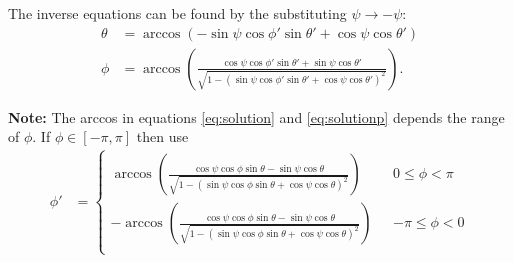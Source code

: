 \documentclass[11pt]{article}
\begin{document}
The inverse equations can be found by the substituting $\psi \rightarrow -\psi$:
\begin{subequations}
\begin{align}
  \theta &= \arccos\left(-\sin\psi\cos\phi'\sin\theta' + \cos\psi\cos\theta'\right)\\
  \phi &= \arccos\left(\frac{\cos\psi\cos\phi'\sin\theta' + \sin\psi\cos\theta'}{\sqrt{1 - (\sin\psi\cos\phi'\sin\theta' + \cos\psi\cos\theta')^2}}\right).
\end{align}\label{eq:solutionp}%
\end{subequations}

\textbf{Note:} The arccos in equations \ref{eq:solution} and \ref{eq:solutionp}
depends the range of $\phi$. If $\phi \in [-\pi, \pi]$ then use
\begin{align}
  \phi' &=
          \begin{cases}
            \arccos\left(\frac{\cos\psi\cos\phi\sin\theta - \sin\psi\cos\theta}{\sqrt{1 - (\sin\psi\cos\phi\sin\theta + \cos\psi\cos\theta)^2}}\right) \ \ \ &0 \leq \phi < \pi  \\
            -\arccos\left(\frac{\cos\psi\cos\phi\sin\theta - \sin\psi\cos\theta}{\sqrt{1 - (\sin\psi\cos\phi\sin\theta + \cos\psi\cos\theta)^2}}\right) \ \ \ &-\pi \leq \phi < 0\\
          \end{cases}
\end{align}
\end{document}
